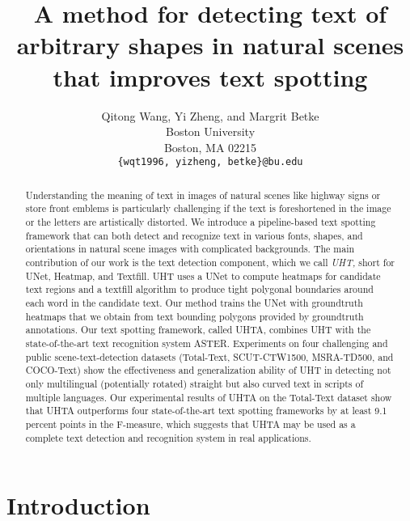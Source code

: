\documentclass[10pt,twocolumn,letterpaper]{article}
\begin{document}
\title{A method for detecting text of arbitrary shapes in natural scenes that improves text spotting}

\author{Qitong Wang, Yi Zheng, and Margrit Betke \\
Boston University \\
Boston, MA 02215 \\
{\tt\small \{wqt1996, yizheng, betke\}@bu.edu}}



\maketitle


\begin{abstract}


 Understanding the meaning of text in images of natural scenes like highway signs or store front emblems is particularly challenging if the text is foreshortened in the image or the letters are artistically distorted.  We introduce a  pipeline-based text spotting framework that can both detect and recognize text in various fonts, shapes, and orientations in natural scene images with complicated backgrounds. The main contribution of our work is the text detection component, which we call {\em UHT,} short for UNet, Heatmap, and Textfill.  UHT uses a
UNet to compute heatmaps for candidate text regions and a textfill algorithm to produce tight polygonal boundaries around each word in the candidate text. Our method trains the UNet with groundtruth heatmaps that we obtain from text bounding polygons provided by groundtruth annotations. Our text spotting framework, called UHTA, combines UHT with the state-of-the-art text recognition system ASTER.  
  Experiments on four challenging and public scene-text-detection datasets (Total-Text, SCUT-CTW1500, MSRA-TD500, and COCO-Text)
   show the effectiveness and generalization ability of UHT in detecting not only multilingual (potentially rotated) straight but also curved text in scripts of multiple languages. Our experimental results of UHTA on the Total-Text dataset show that UHTA outperforms four state-of-the-art text spotting frameworks 
   by at least 9.1 percent points in the F-measure, which suggests that UHTA may be used as a complete text detection and recognition system in real applications.
\end{abstract}





\section{Introduction}
\end{document}
